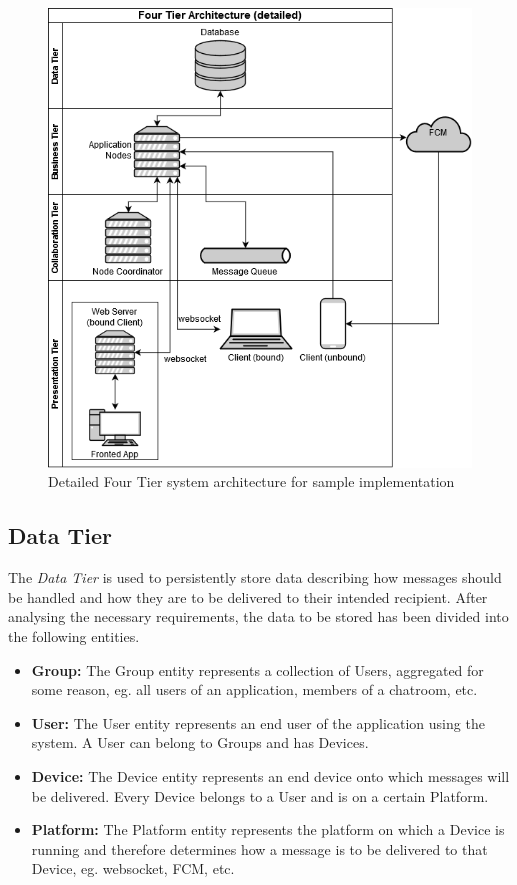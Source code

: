\begin{figure}[!ht]
	\centering
	\includegraphics[width=1\textwidth]{figures/03_design/layer-arch-detail}
    \caption{Detailed Four Tier system architecture for sample implementation}
    \label{fig:s-impl-arch}
\end{figure}

\clearpage

\subsection{Data Tier} \label{design:data-layer}
The \textit{Data Tier} is used to persistently store data describing how messages should be handled and how they are to be delivered to their intended recipient. After analysing the necessary requirements, the data to be stored has been divided into the following entities.
\begin{itemize}
\item \textbf{Group:} The Group entity represents a collection of Users, aggregated for some reason, eg. all users of an application, members of a chatroom, etc.
\item \textbf{User:} The User entity represents an end user of the application using the system. A User can belong to Groups and has Devices.
\item \textbf{Device:} The Device entity represents an end device onto which messages will be delivered. Every Device belongs to a User and is on a certain Platform.
\item \textbf{Platform:} The Platform entity represents the platform on which a Device is running and therefore determines how a message is to be delivered to that Device, eg. websocket, FCM, etc.
\end{itemize}

